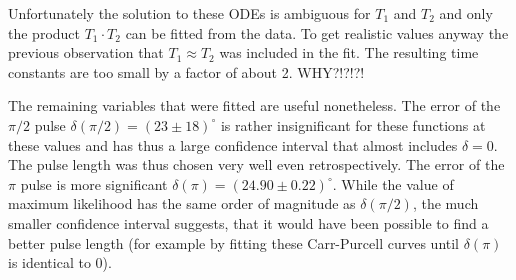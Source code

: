 \documentclass[a4paper]{scrartcl}
\numberwithin{equation}{section}
\numberwithin{figure}{section}
\numberwithin{table}{section}
\begin{document}
Unfortunately the solution to these ODEs is ambiguous for $T_1$ and $T_2$ and only the product $T_1 \cdot T_2$ can be fitted from the data. To get realistic values anyway the previous observation that $T_1 \approx T_2$ was included in the fit. The resulting time constants are too small by a factor of about 2. WHY?!?!?!

The remaining variables that were fitted are useful nonetheless. The error of the $\pi/2$ pulse $\delta(\pi/2) = (23 \pm 18)^\circ$ is rather insignificant for these functions at these values and has thus a large confidence interval that almost includes $\delta = 0$. The pulse length was thus chosen very well even retrospectively. The error of the $\pi$ pulse is more significant $\delta(\pi)=(24.90\pm 0.22)^\circ$. While the value of maximum likelihood has the same order of magnitude as $\delta(\pi/2)$, the much smaller confidence interval suggests, that it would have been possible to find a better pulse length (for example by fitting these Carr-Purcell curves until $\delta(\pi)$ is identical to 0). 


\FloatBarrier
\clearpage
 

\end{document}
